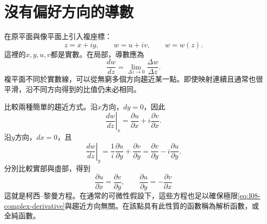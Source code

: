 \begin{classroomqa}
\end{classroomqa}

\begin{classroomqa}
\end{classroomqa}

\section{沒有偏好方向的導數}

在原平面與像平面上引入複座標：
\begin{equation}
  z=x+iy,
  \qquad
  w=u+iv,
  \qquad
  w=w(z).
  \label{eq:l08-complex-coordinates}
\end{equation}
這裡的\(x,y,u,v\)都是實數。在局部，導數應為
\begin{equation}
  \frac{dw}{dz}
  =\lim_{\Delta z\to0}\frac{\Delta w}{\Delta z}.
  \label{eq:l08-complex-derivative}
\end{equation}
複平面不同於實數線，可以從無窮多個方向趨近某一點。即使映射連續且通常也很平滑，沿不同方向得到的比值仍未必相同。

比較兩種簡單的趨近方式。沿\(x\)方向，\(dy=0\)，因此
\begin{equation}
  \left.\frac{dw}{dz}\right|_x
  =\frac{\partial u}{\partial x}
  +i\frac{\partial v}{\partial x}.
\end{equation}
沿\(y\)方向，\(dx=0\)，且
\begin{equation}
  \left.\frac{dw}{dz}\right|_y
  =\frac{1}{i}\frac{\partial u}{\partial y}
  +\frac{\partial v}{\partial y}
  =\frac{\partial v}{\partial y}
  -i\frac{\partial u}{\partial y}.
\end{equation}
分別比較實部與虛部，得到
\begin{equation}
  \boxed{
  \frac{\partial u}{\partial x}
  =\frac{\partial v}{\partial y},
  \qquad
  \frac{\partial u}{\partial y}
  =-\frac{\partial v}{\partial x}}
  \label{eq:l08-cauchy-riemann}
\end{equation}
這就是柯西--黎曼方程。在通常的可微性假設下，這些方程也足以確保極限\eqref{eq:l08-complex-derivative}與趨近方向無關。在該點具有此性質的函數稱為解析函數，或全純函數。

